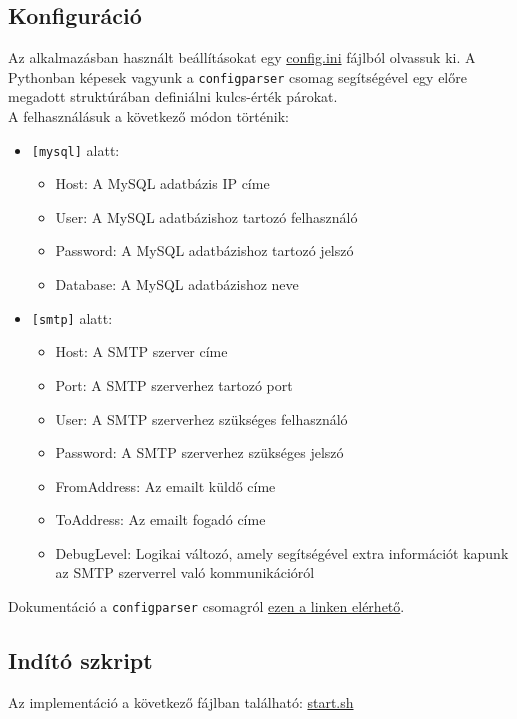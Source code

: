\documentclass[11pt, a4paper]{article}
\begin{document}
		\subsection{Konfiguráció}
			\begin{flushleft}
				\justifying
				Az alkalmazásban használt beállításokat egy
				\color{blue} \href{https://github.com/mark182182/GKLB_INTM020_mikroelektromechanikai_rendszerek/blob/main/config.ini}{config.ini}
				\color{black}
				fájlból olvassuk ki. A Pythonban képesek vagyunk a \texttt{configparser} csomag segítségével egy előre megadott struktúrában definiálni kulcs-érték párokat. \\
				A felhasználásuk a következő módon történik:
				\begin{itemize}
					\item \texttt{[mysql]} alatt:
					\begin{itemize}
						\item Host: A MySQL adatbázis IP címe
						\item User: A MySQL adatbázishoz tartozó felhasználó
						\item Password: A MySQL adatbázishoz tartozó jelszó
						\item Database: A MySQL adatbázishoz neve
					\end{itemize}
					\item \texttt{[smtp]} alatt:
						\begin{itemize}
							\item Host: A SMTP szerver címe
							\item Port: A SMTP szerverhez tartozó port
							\item User: A SMTP szerverhez szükséges felhasználó
							\item Password: A SMTP szerverhez szükséges jelszó
							\item FromAddress: Az emailt küldő címe
							\item ToAddress: Az emailt fogadó címe
							\item DebugLevel: Logikai változó, amely segítségével extra információt kapunk az SMTP szerverrel való kommunikációról
						\end{itemize}
				\end{itemize}
				Dokumentáció a \texttt{configparser} csomagról
				\color{blue}
				\href{https://docs.python.org/3/library/configparser.html}{ezen a linken elérhető}\color{black}.
			\end{flushleft}
			
		\subsection{Indító szkript}
			\begin{flushleft}
				\justifying
				Az implementáció a következő fájlban található:
				\color{blue}
				\href{https://github.com/mark182182/GKLB_INTM020_mikroelektromechanikai_rendszerek/blob/main/start.sh}{start.sh}
			\end{flushleft}
\end{document}

